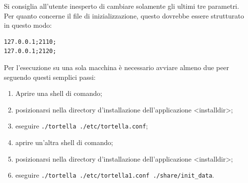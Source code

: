 Si consiglia all'utente inesperto di cambiare solamente gli ultimi tre parametri. Per quanto concerne il file di inizializzazione, questo dovrebbe essere strutturato in questo modo:
\begin{lstlisting}
127.0.0.1;2110;
127.0.0.1;2120;
\end{lstlisting}
Per l'esecuzione su una sola macchina è necessario avviare almeno due peer seguendo questi semplici passi:
\begin{enumerate}
\item Aprire una shell di comando;
\item posizionarsi nella directory d'installazione dell'applicazione <installdir>;
\item eseguire \texttt{./tortella ./etc/tortella.conf};
\item aprire un'altra shell di comando;
\item posizionarsi nella directory d'installazione dell'applicazione <installdir>;
\item eseguire \texttt{./tortella ./etc/tortella1.conf ./share/init\_data}. 
\end{enumerate}

